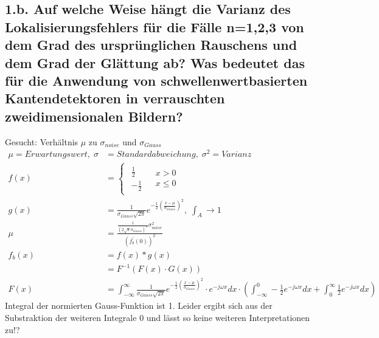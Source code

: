\subsection*{1.b. Auf welche Weise h\"angt die Varianz des Lokalisierungsfehlers f\"ur die F\"alle n=1,2,3 von dem Grad des urspr\"unglichen Rauschens und dem Grad der Gl\"attung ab? Was bedeutet das f\"ur die Anwendung von schwellenwertbasierten Kantendetektoren in verrauschten zweidimensionalen Bildern?}

Gesucht: \; Verh\"altnis $\mu$ zu $\sigma_{noise}$ und $\sigma_{Gauss}$ \\
\begin{align*}
\mu = Erwartungswert, \;
\sigma &= Standardabweichung, \;
\sigma^{2} =Varianz \\
f(x) &=\begin{cases}
\begin{array}{c}
\frac{1}{2} \\
-\frac{1}{2}
\end{array} & \begin{array}{c}
x>0\\
x\leq0
\end{array}\end{cases} \\
g(x) &= \frac{1}{\sigma_{Gauss}\sqrt{2\pi}}e^{-\frac{1}{2}(\frac{x-\mu}{\sigma_{Gauss}})^{2}}, \; \int_{A}\rightarrow1 \\
\mu &= \frac{\frac{1}{(2\sqrt{\pi}\sigma_{Gauss})^{n}}\sigma_{noise}^{2}}{(f_{b}^{'}(0))^{2}} \\
f_{b}(x) &= f(x)*g(x) \\
&= F^{-1}(F(x)\cdot G(x)) \\
F(x) &= \int_{-\infty}^{\infty}\frac{1}{\sigma_{Gauss}\sqrt{2\pi}}e^{-\frac{1}{2}(\frac{x-\mu}{\sigma_{Gauss}})^{2}}
\cdot e^{-j\omega x}dx
\cdot (\int_{-\infty}^{0}-\frac{1}{2}e^{-j\omega x}dx+\int_{0}^{\infty}\frac{1}{2}e^{-j\omega x}dx)
\end{align*}
Integral der normierten Gauss-Funktion ist 1. Leider ergibt sich aus der Substraktion der weiteren Integrale 0 und l\"asst so keine weiteren Interpretationen zu!?
